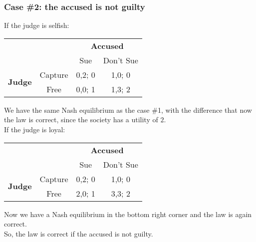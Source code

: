 \documentclass{article}
\begin{document}
\subsubsection{Case \#2: the accused is not guilty}
If the judge is selfish:
\begin{center}
\begin{tabular}{cccc}
                                                     &                              & \multicolumn{2}{c}{\textbf{Accused}}                         \\ \cline{3-4} 
                                                     & \multicolumn{1}{c|}{}        & \multicolumn{1}{c|}{Sue}    & \multicolumn{1}{c|}{Don't Sue} \\ \cline{2-4} 
\multicolumn{1}{c|}{\multirow{2}{*}{\textbf{Judge}}} & \multicolumn{1}{c|}{Capture} & \multicolumn{1}{c|}{0,2; 0} & \multicolumn{1}{c|}{1,0; 0}    \\ \cline{2-4} 
\multicolumn{1}{c|}{}                                & \multicolumn{1}{c|}{Free}    & \multicolumn{1}{c|}{0,0; 1} & \multicolumn{1}{c|}{1,3; 2}    \\ \cline{2-4} 
\end{tabular}
\end{center}
We have the same Nash equilibrium as the case \#1, with the difference that now the law is correct, since the society has a utility of $2$.\\
If the judge is loyal:
\begin{center}
\begin{tabular}{cccc}
                                                     &                              & \multicolumn{2}{c}{\textbf{Accused}}                         \\ \cline{3-4} 
                                                     & \multicolumn{1}{c|}{}        & \multicolumn{1}{c|}{Sue}    & \multicolumn{1}{c|}{Don't Sue} \\ \cline{2-4} 
\multicolumn{1}{c|}{\multirow{2}{*}{\textbf{Judge}}} & \multicolumn{1}{c|}{Capture} & \multicolumn{1}{c|}{0,2; 0} & \multicolumn{1}{c|}{1,0; 0}    \\ \cline{2-4} 
\multicolumn{1}{c|}{}                                & \multicolumn{1}{c|}{Free}    & \multicolumn{1}{c|}{2,0; 1} & \multicolumn{1}{c|}{3,3; 2}    \\ \cline{2-4} 
\end{tabular}
\end{center}
Now we have a Nash equilibrium in the bottom right corner and the law is again correct.\\
So, the law is correct if the accused is not guilty.
\end{document}
